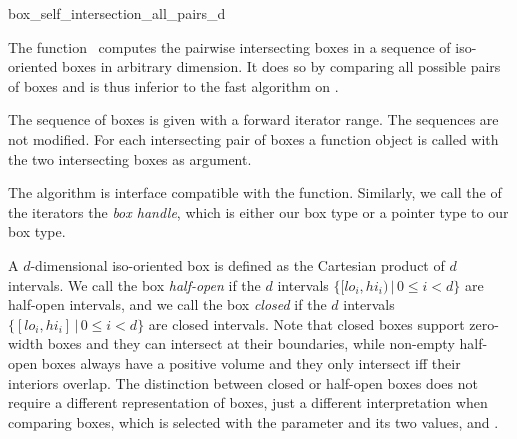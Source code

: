

\begin{ccRefFunction}{box_self_intersection_all_pairs_d}

\ccDefinition
  
The function \ccRefName\ computes the pairwise intersecting boxes
in a sequence of iso-oriented boxes in arbitrary dimension.
It does so by comparing all possible pairs of boxes and is thus
inferior to the fast  algorithm on
.

The sequence of boxes is given with a forward iterator range. The
sequences are not modified. For each intersecting pair of boxes a
 function object is called with the two intersecting
boxes as argument.

The algorithm is interface compatible with the
 function. Similarly, we call the
 of the iterators the \emph{box handle}, which is
either our box type or a pointer type to our box type.

A $d$-dimensional iso-oriented box is defined as the Cartesian product
of $d$ intervals. We call the box \emph{half-open} if the $d$
intervals $\{ [lo_i,hi_i) \,|\, 0 \leq i < d\}$ are half-open intervals,
and we call the box \emph{closed} if the $d$ intervals $\{ [lo_i,hi_i]
\,|\, 0 \leq i < d\}$ are closed intervals. Note that closed boxes support
zero-width boxes and they can intersect at their boundaries, while
non-empty half-open boxes always have a positive volume and they only
intersect iff their interiors overlap.  The distinction between closed
or half-open boxes does not require a different representation of
boxes, just a different interpretation when comparing boxes, which is
selected with the  parameter and its two values,
 and
.


\end{ccRefFunction}
